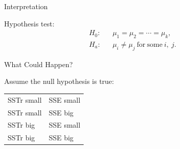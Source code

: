 \begin{frame}{Interpretation}

  Hypothesis test:
  \begin{eqnarray*}
    H_0: & & \mu_1 = \mu_2 = \cdots = \mu_k, \\
    H_a: & & \mu_i \neq \mu_j ~\mathrm{for~some~}i,~j.
  \end{eqnarray*}

  
\end{frame}

\begin{frame}{What Could Happen?}

  Assume the null hypothesis is true: \\
  \begin{tabular}{ll}
    SSTr small & SSE small \\
    SSTr small & SSE big \\
    SSTr big & SSE small \\
    SSTr big & SSE big \\
  \end{tabular}
  
\end{frame}

